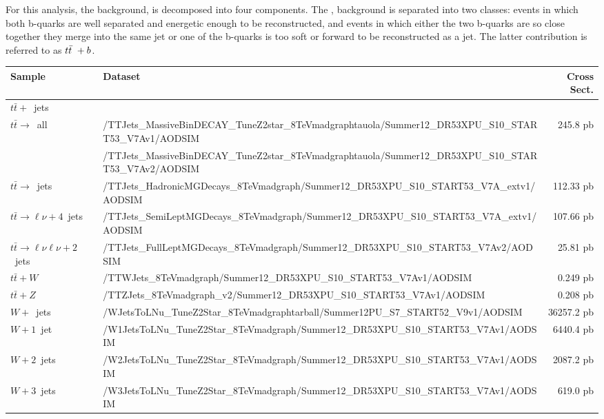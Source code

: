 \par  For this analysis, the \ttjets background, is decomposed into
four components.  The \ttbb, background is separated into two classes:
\ttbb events in which both b-quarks are well separated and energetic
enough to be reconstructed, and events in which either the two
b-quarks are so close together they merge into the same jet or one of
the b-quarks is too soft or forward to be reconstructed as a jet.  The
latter contribution is referred to as $t{\bar{t}}~+b$. 

\begin{table}[hbtp]\footnotesize
\centering
\begin{tabular}{|p{}|p{}|r|}
\hline\hline
Sample & Dataset & Cross Sect. \\
\hline
$t\bar{t}+$~jets & & \\
$t\bar{t}\rightarrow$~all & /TTJets\_MassiveBinDECAY\_TuneZ2star\_8TeV\-madgraph\-tauola/Summer12\_DR53X\-PU\_S10\_START53\_V7A\-v1/AODSIM & 245.8 pb \\
 & /TTJets\_MassiveBinDECAY\_TuneZ2star\_8TeV\-madgraph\-tauola/Summer12\_DR53X\-PU\_S10\_START53\_V7A\-v2/AODSIM & \\
$t\bar{t}\rightarrow$~jets & /TTJets\_HadronicMGDecays\_8TeV\-madgraph/Summer12\_DR53X\-PU\_S10\_START53\_V7A\_ext\-v1/AODSIM & 112.33 pb \\
$t\bar{t}\rightarrow\ell\nu+4$~jets & /TTJets\_SemiLeptMGDecays\_8TeV\-madgraph/Summer12\_DR53X\-PU\_S10\_START53\_V7A\_ext\-v1/AODSIM & 107.66 pb \\
$t\bar{t}\rightarrow\ell\nu\ell\nu+2$~jets & /TTJets\_FullLeptMGDecays\_8TeV\-madgraph/Summer12\_DR53X\-PU\_S10\_START53\_V7A\-v2/AODSIM & 25.81 pb \\
\hline
$t\bar{t}+W$ & /TTWJets\_8TeV\-madgraph/Summer12\_DR53X\-PU\_S10\_START53\_V7A\-v1/AODSIM & 0.249 pb \\
\hline
$t\bar{t}+Z$ & /TTZJets\_8TeV\-madgraph\_v2/Summer12\_DR53X\-PU\_S10\_START53\_V7A\-v1/AODSIM & 0.208 pb \\
\hline
$W+$~jets & /WJetsToLNu\_TuneZ2Star\_8TeV\-madgraph\-tarball/Summer12\-PU\_S7\_START52\_V9\-v1/AODSIM & 36257.2 pb \\
$W+1$~jet & /W1JetsToLNu\_TuneZ2Star\_8TeV\-madgraph/Summer12\_DR53X\-PU\_S10\_START53\_V7A\-v1/AODSIM  & 6440.4 pb \\
$W+2$~jets & /W2JetsToLNu\_TuneZ2Star\_8TeV\-madgraph/Summer12\_DR53X\-PU\_S10\_START53\_V7A\-v1/AODSIM & 2087.2 pb \\
$W+3$~jets & /W3JetsToLNu\_TuneZ2Star\_8TeV\-madgraph/Summer12\_DR53X\-PU\_S10\_START53\_V7A\-v1/AODSIM & 619.0 pb \\

\end{tabular}
\end{table}
